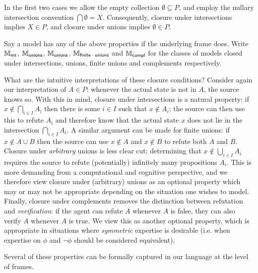 In the first two cases we allow the empty collection $\emptyset \subseteq P$,
and employ the nullary intersection convention $\bigcap \emptyset = X$.
Consequently, closure under intersections implies $X \in P$, and closure under
unions implies $\emptyset \in P$.

Say a model has any of the above properties if the underlying frame does. Write
$\mathbb{M}_{\mathsf{int}}$, $\mathbb{M}_{\mathsf{unions}}$, $\mathbb{M}_{\mathsf{unions}}$, $\mathbb{M}_{\mathsf{finite-unions}}$ and $\mathbb{M}_{\mathsf{compl}}$ for the classes
of models closed under intersections, unions, finite unions and complements
respectively.

What are the intuitive interpretations of these closure conditions? Consider
again our interpretation of $A \in P$: whenever the actual state is not in $A$,
the source knows so. With this in mind, closure under intersections is a
natural property: if $x \notin \bigcap_{i \in I}{A_i}$ then there is some $i
\in I$ such that $x \notin A_i$; the source can then use this to refute $A_i$
and therefore know that the actual state $x$ does not lie in the intersection
$\bigcap_{i \in I}{A_i}$. A similar argument can be made for finite unions: if
$x \notin A \cup B$ then the source can use $x \notin A$ and $x \notin B$ to
refute both $A$ and $B$. Closure under \emph{arbitrary} unions is less clear
cut; determining that $x \notin \bigcup_{i \in I}{A_i}$ requires the source to
refute (potentially) infinitely many propositions $A_i$.  This is more
demanding from a computational and cognitive perspective, and we therefore view
closure under (arbitrary) unions as an optional property which may or may not
be appropriate depending on the situation one wishes to model. Finally,
closure under complements removes the distinction between refutation and
\emph{verification}: if the agent can refute $A$ whenever $A$ is false, they
can also verify $A$ whenever $A$ is true. We view this as another optional
property, which is appropriate in situations where \emph{symmetric} expertise
is desirable (i.e. when expertise on $\phi$ and $\neg\phi$ should be considered
equivalent).

Several of these properties can be formally captured in our language at the
level of frames.

